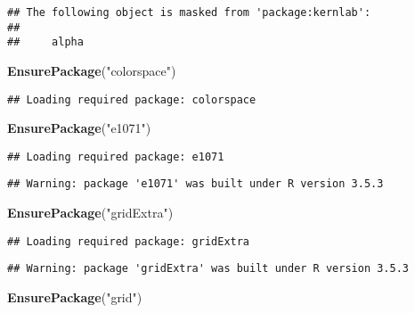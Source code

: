 \documentclass[]{article}
\newenvironment{Shaded}{\begin{snugshade}}{\end{snugshade}}
\newcommand{\KeywordTok}[1]{\textcolor[rgb]{0.13,0.29,0.53}{\textbf{#1}}}
\newcommand{\StringTok}[1]{\textcolor[rgb]{0.31,0.60,0.02}{#1}}
\newcommand{\NormalTok}[1]{#1}
\begin{document}
\begin{verbatim}
## The following object is masked from 'package:kernlab':
## 
##     alpha
\end{verbatim}

\begin{Shaded}
\begin{Highlighting}[]
\KeywordTok{EnsurePackage}\NormalTok{(}\StringTok{"colorspace"}\NormalTok{)}
\end{Highlighting}
\end{Shaded}

\begin{verbatim}
## Loading required package: colorspace
\end{verbatim}

\begin{Shaded}
\begin{Highlighting}[]
\KeywordTok{EnsurePackage}\NormalTok{(}\StringTok{"e1071"}\NormalTok{)}
\end{Highlighting}
\end{Shaded}

\begin{verbatim}
## Loading required package: e1071
\end{verbatim}

\begin{verbatim}
## Warning: package 'e1071' was built under R version 3.5.3
\end{verbatim}

\begin{Shaded}
\begin{Highlighting}[]
\KeywordTok{EnsurePackage}\NormalTok{(}\StringTok{"gridExtra"}\NormalTok{)}
\end{Highlighting}
\end{Shaded}

\begin{verbatim}
## Loading required package: gridExtra
\end{verbatim}

\begin{verbatim}
## Warning: package 'gridExtra' was built under R version 3.5.3
\end{verbatim}

\begin{Shaded}
\begin{Highlighting}[]
\KeywordTok{EnsurePackage}\NormalTok{(}\StringTok{"grid"}\NormalTok{)}
\end{Highlighting}
\end{Shaded}
\end{document}
